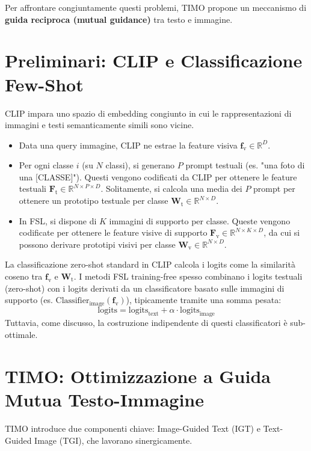 \documentclass[11pt,a4paper]{article}
\newcommand{\Ft}{\mathbf{F}_\text{t}}      %
\newcommand{\Fv}{\mathbf{F}_\text{v}}      %
\newcommand{\Wt}{\mathbf{W}_\text{t}}      %
\newcommand{\Wv}{\mathbf{W}_\text{v}}      %
\newcommand{\fv}{\mathbf{f}_\text{v}}      %
\newcommand{\R}{\mathbb{R}}
\begin{document}
Per affrontare congiuntamente questi problemi, TIMO propone un meccanismo di \textbf{guida reciproca (mutual guidance)} tra testo e immagine.

\section{Preliminari: CLIP e Classificazione Few-Shot}
CLIP impara uno spazio di embedding congiunto in cui le rappresentazioni di immagini e testi semanticamente simili sono vicine.
\begin{itemize}
    \item Data una query immagine, CLIP ne estrae la feature visiva $\fv \in \R^D$.
    \item Per ogni classe $i$ (su $N$ classi), si generano $P$ prompt testuali (es. "una foto di una [CLASSE]"). Questi vengono codificati da CLIP per ottenere le feature testuali $\Ft \in \R^{N \times P \times D}$. Solitamente, si calcola una media dei $P$ prompt per ottenere un prototipo testuale per classe $\Wt \in \R^{N \times D}$.
    \item In FSL, si dispone di $K$ immagini di supporto per classe. Queste vengono codificate per ottenere le feature visive di supporto $\Fv \in \R^{N \times K \times D}$, da cui si possono derivare prototipi visivi per classe $\Wv \in \R^{N \times D}$.
\end{itemize}
La classificazione zero-shot standard in CLIP calcola i logits come la similarità coseno tra $\fv$ e $\Wt$.
I metodi FSL training-free spesso combinano i logits testuali (zero-shot) con i logits derivati da un classificatore basato sulle immagini di supporto (es. $\text{Classifier}_{\text{image}}(\fv)$), tipicamente tramite una somma pesata:
\[ \text{logits} = \text{logits}_{\text{text}} + \alpha \cdot \text{logits}_{\text{image}} \]
Tuttavia, come discusso, la costruzione indipendente di questi classificatori è sub-ottimale.

\section{TIMO: Ottimizzazione a Guida Mutua Testo-Immagine}
TIMO introduce due componenti chiave: Image-Guided Text (IGT) e Text-Guided Image (TGI), che lavorano sinergicamente.
\end{document}
